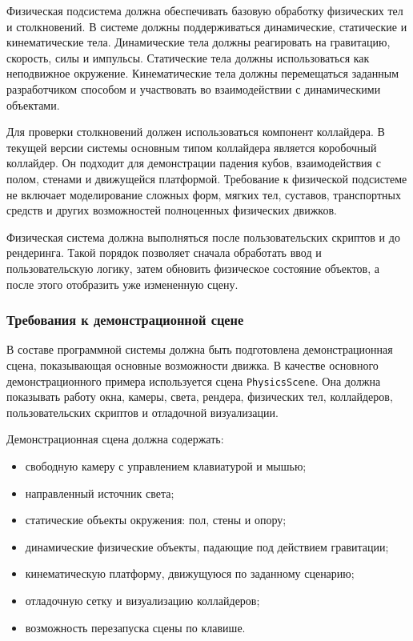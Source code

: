 Физическая подсистема должна обеспечивать базовую обработку физических тел и столкновений. В системе должны поддерживаться динамические, статические и кинематические тела. Динамические тела должны реагировать на гравитацию, скорость, силы и импульсы. Статические тела должны использоваться как неподвижное окружение. Кинематические тела должны перемещаться заданным разработчиком способом и участвовать во взаимодействии с динамическими объектами.

Для проверки столкновений должен использоваться компонент коллайдера. В текущей версии системы основным типом коллайдера является коробочный коллайдер. Он подходит для демонстрации падения кубов, взаимодействия с полом, стенами и движущейся платформой. Требование к физической подсистеме не включает моделирование сложных форм, мягких тел, суставов, транспортных средств и других возможностей полноценных физических движков.

Физическая система должна выполняться после пользовательских скриптов и до рендеринга. Такой порядок позволяет сначала обработать ввод и пользовательскую логику, затем обновить физическое состояние объектов, а после этого отобразить уже измененную сцену.

\subsubsection{Требования к демонстрационной сцене}

В составе программной системы должна быть подготовлена демонстрационная сцена, показывающая основные возможности движка. В качестве основного демонстрационного примера используется сцена \texttt{PhysicsScene}. Она должна показывать работу окна, камеры, света, рендера, физических тел, коллайдеров, пользовательских скриптов и отладочной визуализации.

Демонстрационная сцена должна содержать:
\begin{itemize}
\item свободную камеру с управлением клавиатурой и мышью;
\item направленный источник света;
\item статические объекты окружения: пол, стены и опору;
\item динамические физические объекты, падающие под действием гравитации;
\item кинематическую платформу, движущуюся по заданному сценарию;
\item отладочную сетку и визуализацию коллайдеров;
\item возможность перезапуска сцены по клавише.
\end{itemize}

